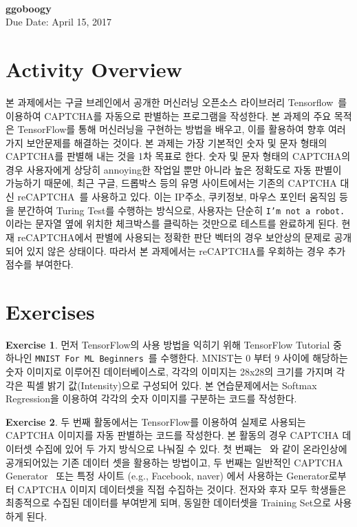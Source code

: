 \documentclass[a4paper, 11pt]{article}
\theoremstyle{definition}
\newtheorem{exercise}{Exercise}
\begin{document}
 \\
         {\phantom{} \hfill \textbf{ggoboogy}} \\
         {\phantom{} \hfill Due Date: April 15, 2017} \\

\section{Activity Overview}
본 과제에서는 구글 브레인에서 공개한 머신러닝 오픈소스 라이브러리 Tensorflow~\cite{tensorflow}를 이용하여 CAPTCHA를 자동으로 판별하는 프로그램을 작성한다. 
본 과제의 주요 목적은 TensorFlow를 통해 머신러닝을 구현하는 방법을 배우고, 이를 활용하여 향후 여러가지 보안문제를 해결하는 것이다. 
본 과제는 가장 기본적인 숫자 및 문자 형태의 CAPTCHA를 판별해 내는 것을 1차 목표로 한다. 
숫자 및 문자 형태의 CAPTCHA의 경우 사용자에게 상당히 annoying한 작업일 뿐만 아니라 높은 정확도로 자동 판별이 가능하기 때문에, 
최근 구글, 드롭박스 등의 유명 사이트에서는 기존의 CAPTCHA 대신 reCAPTCHA~\cite{recaptcha}를 사용하고 있다. 
이는 IP주소, 쿠키정보, 마우스 포인터 움직임 등을 분간하여 Turing Test를 수행하는 방식으로, 
사용자는 단순히 \texttt{I'm not a robot.} 이라는 문자열 옆에 위치한 체크박스를 클릭하는 것만으로 테스트를 완료하게 된다.
현재 reCAPTCHA에서 판별에 사용되는 정확한 판단 벡터의 경우 보안상의 문제로 공개되어 있지 않은 상태이다. 
따라서 본 과제에서는 reCAPTCHA를 우회하는 경우 추가점수를 부여한다. 

\section{Exercises}

\begin{exercise}
먼저 TensorFlow의 사용 방법을 익히기 위해 TensorFlow Tutorial 중 하나인 \texttt{MNIST For ML Beginners}~\cite{tftutorial}를 수행한다. 
MNIST는 0 부터 9 사이에 해당하는 숫자 이미지로 이루어진 데이터베이스로, 
각각의 이미지는 28x28의 크기를 가지며 각각은 픽셀 밝기 값(Intensity)으로 구성되어 있다. 
본 연습문제에서는 Softmax Regression을 이용하여 각각의 숫자 이미지를 구분하는 코드를 작성한다. 
\end{exercise}

\begin{exercise}
두 번째 활동에서는 TensorFlow를 이용하여 실제로 사용되는 CAPTCHA 이미지를 자동 판별하는 코드를 작성한다. 
본 활동의 경우 CAPTCHA 데이터셋 수집에 있어 두 가지 방식으로 나눠질 수 있다. 
첫 번째는 ~\cite{captchaset}와 같이 온라인상에 공개되어있는 기존 데이터 셋을 활용하는 방법이고, 
두 번째는 일반적인 CAPTCHA Generator~\cite{generator1, generator2, generator3} 또는 
특정 사이트 (e.g., Facebook, naver) 에서 사용하는 Generator로부터 CAPTCHA 이미지 데이터셋을 직접 수집하는 것이다.
전자와 후자 모두 학생들은 최종적으로 수집된 데이터를 부여받게 되며, 동일한 데이터셋을 Training Set으로 사용하게 된다.

\end{exercise} 
\end{document}
